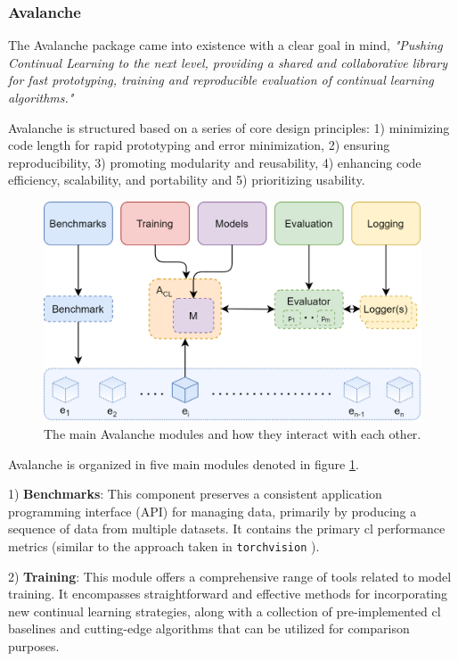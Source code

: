 \subsubsection{Avalanche}
\label{sec:avalanche}
The Avalanche package came into existence with a clear goal in mind, \textit{"Pushing Continual Learning to the next level, providing a shared and collaborative library for fast prototyping, training and reproducible evaluation of continual learning algorithms."} \citep{avalancheContinualAIFiveMinutes}

Avalanche is structured based on a series of core design principles: 1) minimizing code length for rapid prototyping and error minimization, 2) ensuring reproducibility, 3) promoting modularity and reusability, 4) enhancing code efficiency, scalability, and portability and 5) prioritizing usability.


\begin{figure}[H]
    \centering
    \includegraphics{Images//avalanche.png}
    \caption{The main Avalanche modules and how they interact with each other. \citep{avalancheContinualAIFiveMinutes} }
    \label{fig:avalanche}
\end{figure}
Avalanche is organized in five main modules denoted in figure \ref{fig:avalanche}. 

1) \textbf{Benchmarks}: This component preserves a consistent application programming interface (API) for managing data, primarily by producing a sequence of data from multiple datasets. It contains the primary \acrshort{cl} performance metrics (similar to the approach taken in \verb|torchvision| ).

2) \textbf{Training}: This module offers a comprehensive range of tools related to model training. It encompasses straightforward and effective methods for incorporating new continual learning strategies, along with a collection of pre-implemented \acrshort{cl} baselines and cutting-edge algorithms that can be utilized for comparison purposes.

